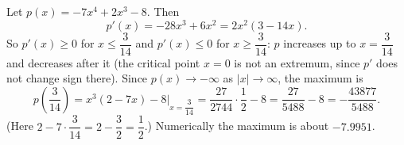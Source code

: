 Let $p(x)=-7x^4+2x^3-8$. Then
\[
p'(x)=-28x^3+6x^2=2x^2(3-14x).
\]
So $p'(x)\ge0$ for $x\le\dfrac{3}{14}$ and $p'(x)\le0$ for $x\ge\dfrac{3}{14}$: $p$ increases up to $x=\dfrac{3}{14}$ and decreases after it (the critical point $x=0$ is not an extremum, since $p'$ does not change sign there). Since $p(x)\to-\infty$ as $|x|\to\infty$, the maximum is
\[
p\!\left(\dfrac{3}{14}\right)=x^3(2-7x)-8\Big|_{x=\dfrac{3}{14}}=\dfrac{27}{2744}\cdot\dfrac{1}{2}-8=\dfrac{27}{5488}-8=\boxed{-\dfrac{43877}{5488}} .
\]
(Here $2-7\cdot\dfrac{3}{14}=2-\dfrac{3}{2}=\dfrac{1}{2}$.) Numerically the maximum is about $-7.9951$.
